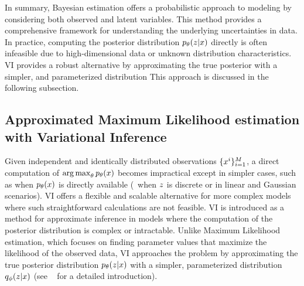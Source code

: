 

In summary, Bayesian estimation offers a probabilistic approach 
to modeling by considering
both observed and latent variables. This method provides a comprehensive
framework for understanding the underlying uncertainties in data. In practice,
computing the posterior distribution $p_{\theta}(z|x)$ directly is often
infeasible due to high-dimensional data or unknown distribution characteristics.
VI provides a robust alternative by approximating the
true posterior with a simpler, and parameterized distribution
This approach  is discussed in the following subsection.


\subsection{Approximated Maximum Likelihood estimation with Variational Inference}
\label{subsec:vbi}

Given independent and identically distributed observations
$\{x^i\}_{i=1}^M$,  a
direct computation of $\operatorname*{arg\,max}_{\theta} p_{\theta}(x)$ becomes impractical except in
simpler cases, such as when $p_{\theta}(x)$ is directly available (\eg~when $z$ is
discrete or in linear and Gaussian scenarios). 
VI offers a flexible and scalable alternative
for more complex models where such straightforward calculations are not feasible.
VI is introduced as a method for approximate inference in
models where the computation of the posterior distribution is complex or
intractable. Unlike Maximum Likelihood estimation, which focuses on finding
parameter values that maximize the likelihood of the observed data, VI 
approaches the problem by approximating the true posterior
distribution $p_{\theta}(z|x)$ with a simpler, parameterized distribution 
$q_\phi(z|x)$ (see \eg~\cite{Blei_2017} for a detailed introduction).



